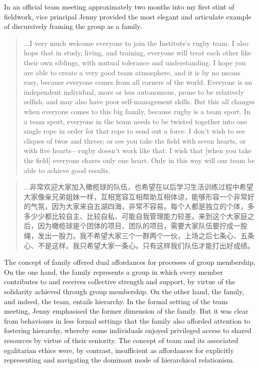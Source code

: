 \begin{CJK}{UTF8}{gbsn}
In an official team meeting approximately two months into my first stint of fieldwork, vice principal Jenny provided the most elegant and articulate example of discursively framing the group as a family.

    \begin{quotation}
      ...I very much welcome everyone to join the Institute's rugby team. I also hope that in study, living, and training, everyone will treat each other like their own siblings, with mutual tolerance and understanding.  I hope you are able to create a very good team atmosphere, and it is by no means easy, because everyone comes from all corners of the world. Everyone is an independent individual, more or less autonomous, prone to be relatively selfish, and may also have poor self-management skills.  But this all changes when everyone comes to this big family, because rugby is a team sport. In a team sport, everyone in the team needs to be twisted together into one single rope in order for that rope to send out a force. I don't wish to see cliques of twos and threes; or see you take the field with seven hearts, or with five hearts---rugby doesn't work like that. I wish that [when you take the field] everyone shares only one heart. Only in this way will our team be able to achieve good results.
    \end{quotation}

    \begin{quotation}
      ...非常欢迎大家加入橄榄球的队伍，也希望在以后学习生活训练过程中希望大家像亲兄弟姐妹一样，互相宽容互相帮助互相体谅，能够形容一个非常好的气氛，因为大家来自五湖四海，非常不容易。每个人都是独立的个体，多多少少都比较自主、比较自私、可能自我管理能力较差。来到这个大家庭之后，因为橄榄球是个团体的项目、团队的项目，需要大家队伍要拧成一股绳，发出一股力。我不希望大家三个一群两个一伙，上场之后七条心、五条心、不是这样。我只希望大家一条心。只有这样我们队伍才能打出好成绩。
    \end{quotation}

The concept of family offered dual affordances for processes of group membership.  On the one hand, the family represents a group in which every member contributes to and receives collective strength and support, by virtue of the solidarity achieved through group membership.  On the other hand, the family, and indeed, the team,  entails hierarchy.  In the formal setting of the team meeting, Jenny emphasised the former dimension of the family.  But it was clear from behaviours in less formal settings that the family also afforded attention to fostering hierarchy, whereby some individuals enjoyed privileged access to shared resources by virtue of their seniority.  The concept of team and its associated egalitarian ethics were, by contrast, insufficient as affordances for explicitly representing and navigating the dominant mode of hierarchical relationism.


\end{CJK}
